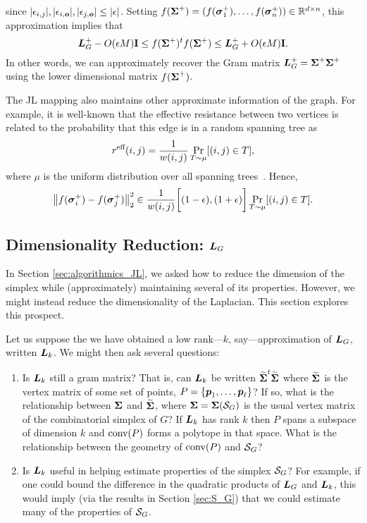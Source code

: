 since $|\epsilon_{i,j}|, |\epsilon_{i,\vb*{o}}|,|\epsilon_{j,\vb*{o}}|\leq |\epsilon|$. Setting $f(\boldsymbol{\Sigma}^+) = (f(\vb*{\sigma}_1^+),\dots,f(\vb*{\sigma}_n^+))\in \mathbb{R}^{d\times n}$, this approximation implies that 
\begin{equation*}
\vb*{L}_G^+ - O(\epsilon M)\vb{I} \leq f(\boldsymbol{\Sigma}^+)^t f(\boldsymbol{\Sigma}^+) \leq \vb*{L}_G^+ + O(\epsilon M)\vb{I}. 
\end{equation*}
In other words, we can approximately recover the Gram matrix $\vb*{L}_G^+=\boldsymbol{\Sigma}^+\boldsymbol{\Sigma}^+$ using the lower dimensional matrix $f(\boldsymbol{\Sigma}^+)$. 

The JL mapping also maintains other approximate information of the graph.  For  example,  it is well-known that the effective resistance between two vertices is related to the probability that this edge  is in a random  spanning  tree as 
\begin{equation*}
	r^{\textnormal{eff}}(i,j) = \frac{1}{w(i,j)} \Pr_{T\sim \mu}[(i,j)\in T],
\end{equation*}
where $\mu$ is the uniform distribution over all spanning trees~\cite{burton1993local}. Hence, 
\begin{equation*}
\norm{f(\vb*{\sigma}_i^+)-f(\vb*{\sigma}_j^+)}_2^2 \in \frac{1}{w(i,j)}\bigg[(1-\epsilon),(1+\epsilon)\bigg]\Pr_{T\sim \mu}[(i,j)\in T].
\end{equation*}
	

\subsection{Dimensionality Reduction: \texorpdfstring{$\vb*{L}_G$}{the Laplacian}}
\label{sec:algorithmics_low_rank}
In Section  \ref{sec:algorithmics_JL}, we asked how to reduce the  dimension of the  simplex  while (approximately) maintaining several of its  properties. However,  we might instead  reduce the dimensionality of the  Laplacian. This section explores this prospect. 


Let us suppose the we have obtained a low rank---$k$, say---approximation of $\vb*{L}_G$, written $\vb*{L}_k$. We might then ask several questions: 
\begin{enumerate}
	\item Is $\vb*{L}_k$ still a gram matrix? That is, can $\vb*{L}_k$ be written $\widetilde{\boldsymbol{\Sigma}}^t\widetilde{\boldsymbol{\Sigma}}$ where $\widetilde{\boldsymbol{\Sigma}}$ is the vertex matrix of some set of points, $P=\{\vb*{p}_1,\dots,\vb*{p}_\ell\}$? If so, what is the relationship between $\boldsymbol{\Sigma}$ and $\widetilde{\boldsymbol{\Sigma}}$, where $\boldsymbol{\Sigma}=\boldsymbol{\Sigma}(\mathcal{S}_G)$ is the usual vertex matrix of the combinatorial simplex of $G$? If $\vb*{L}_k$ has rank $k$ then $P$ spans a subspace of dimension $k$ and $\textnormal{conv}(P)$ forms a polytope in that space. What is the relationship between the geometry of $\textnormal{conv}(P)$ and $\mathcal{S}_G$?
	\item Is $\vb*{L}_k$ useful in helping estimate properties of the simplex $\mathcal{S}_G$? For example, if one could bound the difference in the quadratic products of $\vb*{L}_G$ and $\vb*{L}_k$, this would imply (via the results in Section \ref{sec:S_G}) that we could estimate many of the properties of $\mathcal{S}_G$. 
\end{enumerate}


